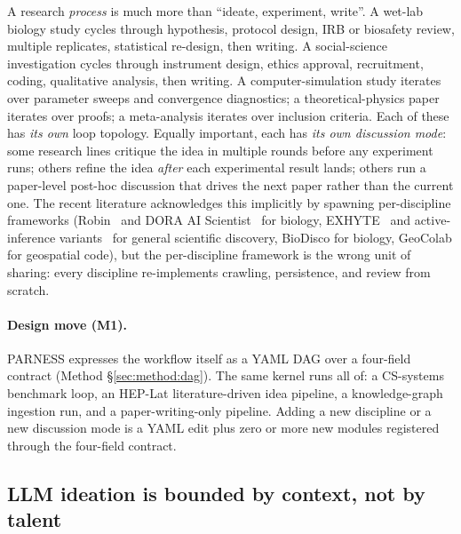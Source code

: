 \documentclass{article}
\newcommand{\parness}{\textsf{PARNESS}}
\begin{document}
A research \emph{process} is much more than ``ideate, experiment, write''.
A wet-lab biology study cycles through hypothesis, protocol design, IRB
or biosafety review, multiple replicates, statistical re-design, then
writing. A social-science investigation cycles through instrument
design, ethics approval, recruitment, coding, qualitative analysis,
then writing. A computer-simulation study iterates over parameter
sweeps and convergence diagnostics; a theoretical-physics paper iterates
over proofs; a meta-analysis iterates over inclusion criteria. Each of
these has \emph{its own} loop topology. Equally important, each has
\emph{its own discussion mode}: some research lines critique the idea in
multiple rounds before any experiment runs; others refine the idea
\emph{after} each experimental result lands; others run a paper-level
post-hoc discussion that drives the next paper rather than the current
one. The recent literature acknowledges this implicitly by spawning
per-discipline frameworks (Robin~\cite{robinmas} and DORA AI
Scientist~\cite{doraaisci} for biology, EXHYTE~\cite{exhyte} and
active-inference variants~\cite{activeinference} for general scientific
discovery, BioDisco for biology, GeoColab for geospatial code), but the
per-discipline framework is the wrong unit of sharing: every discipline
re-implements crawling, persistence, and review from scratch.

\paragraph{Design move (M1).} \parness{} expresses the workflow itself as
a YAML DAG over a four-field contract (Method \S\ref{sec:method:dag}).
The same kernel runs all of: a CS-systems benchmark loop, an HEP-Lat
literature-driven idea pipeline, a knowledge-graph ingestion run, and a
paper-writing-only pipeline. Adding a new discipline or a new discussion
mode is a YAML edit plus zero or more new modules registered through the
four-field contract.

\subsection{LLM ideation is bounded by context, not by talent}
\label{sec:m2}
\end{document}
